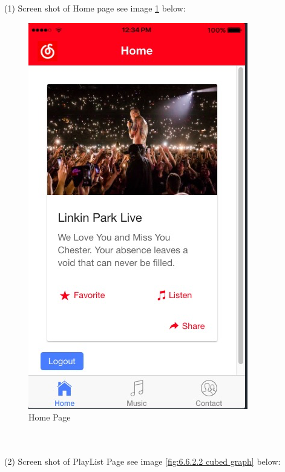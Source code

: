 \\ \\ (1) Screen shot of Home page see image \ref{fig:6.6.2.1 cubed graph} below:
\begin{figure}[h]
	\centering
	\includegraphics[scale=0.5]{img/Home.png}
	\caption{Home Page}
	\label{fig:6.6.2.1 cubed graph}
\end{figure}
\\ \\
(2) Screen shot of PlayList Page see image \ref{fig:6.6.2.2 cubed graph} below:
